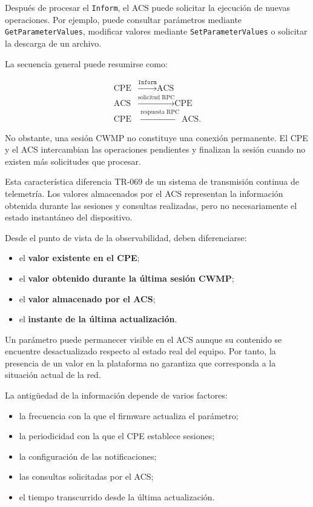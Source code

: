 Después de procesar el \texttt{Inform}, el ACS puede solicitar la
ejecución de nuevas operaciones. Por ejemplo, puede consultar parámetros
mediante \texttt{GetParameterValues}, modificar valores mediante
\texttt{SetParameterValues} o solicitar la descarga de un archivo.

La secuencia general puede resumirse como:

\[
\begin{aligned}
    \text{CPE}
    &\xrightarrow{\texttt{Inform}}
    \text{ACS}\\
    \text{ACS}
    &\xrightarrow{\text{solicitud RPC}}
    \text{CPE}\\
    \text{CPE}
    &\xrightarrow{\text{respuesta RPC}}
    \text{ACS}.
\end{aligned}
\]

No obstante, una sesión CWMP no constituye una conexión permanente. El
CPE y el ACS intercambian las operaciones pendientes y finalizan la
sesión cuando no existen más solicitudes que procesar.

Esta característica diferencia TR-069 de un sistema de transmisión
continua de telemetría. Los valores almacenados por el ACS representan la
información obtenida durante las sesiones y consultas realizadas, pero no
necesariamente el estado instantáneo del dispositivo.

Desde el punto de vista de la observabilidad, deben diferenciarse:

\begin{itemize}
    \item el \textbf{valor existente en el CPE};
    \item el \textbf{valor obtenido durante la última sesión CWMP};
    \item el \textbf{valor almacenado por el ACS};
    \item el \textbf{instante de la última actualización}.
\end{itemize}

Un parámetro puede permanecer visible en el ACS aunque su contenido se
encuentre desactualizado respecto al estado real del equipo. Por tanto,
la presencia de un valor en la plataforma no garantiza que corresponda a
la situación actual de la red.

La antigüedad de la información depende de varios factores:

\begin{itemize}
    \item la frecuencia con la que el firmware actualiza el parámetro;
    \item la periodicidad con la que el CPE establece sesiones;
    \item la configuración de las notificaciones;
    \item las consultas solicitadas por el ACS;
    \item el tiempo transcurrido desde la última actualización.
\end{itemize}

